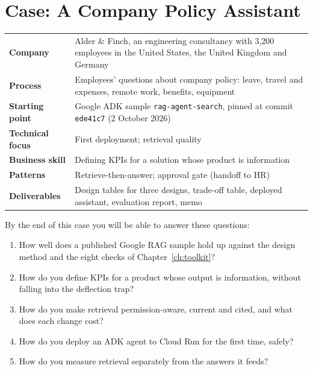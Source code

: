 
\chapter{Case: A Company Policy Assistant}
\label{ch:case-policy}

\begin{caseglance}
\begin{tabularx}{\linewidth}{@{}>{\bfseries}p{3.4cm}X@{}}
Company & Alder \& Finch, an engineering consultancy with 3{,}200 employees in the United States, the United Kingdom and Germany \\
Process & Employees' questions about company policy: leave, travel and expenses, remote work, benefits, equipment \\
Starting point & Google ADK sample \texttt{rag-agent-search}, pinned at commit \texttt{ede41c7} (2 October 2026) \\
Technical focus & First deployment; retrieval quality \\
Business skill & Defining KPIs for a solution whose product is information \\
Patterns & Retrieve-then-answer; approval gate (handoff to HR) \\
Deliverables & Design tables for three designs, trade-off table, deployed assistant, evaluation report, memo
\end{tabularx}
\end{caseglance}

\begin{chapterquestions}
By the end of this case you will be able to answer these questions:
\begin{enumerate}[leftmargin=*,itemsep=2pt]
  \item How well does a published Google RAG sample hold up against the design method and the eight checks of Chapter~\ref{ch:toolkit}?
  \item How do you define KPIs for a product whose output is information, without falling into the deflection trap?
  \item How do you make retrieval permission-aware, current and cited, and what does each change cost?
  \item How do you deploy an ADK agent to Cloud Run for the first time, safely?
  \item How do you measure retrieval separately from the answers it feeds?
\end{enumerate}
\end{chapterquestions}

